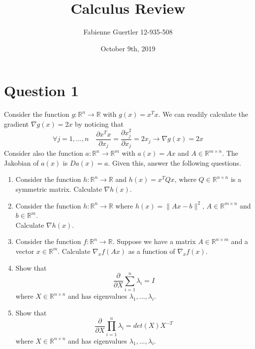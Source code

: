 \documentclass[
	10pt, %
]{../fphw}
\title{Calculus Review} %
\author{Fabienne Guertler 12-935-508} %
\date{October 9th, 2019} %
\institute{University of Bern} %
\begin{document}
	\maketitle
	\section*{Question 1 }
	\begin{problem}
		Consider the function $g:\mathbb{R}^n \rightarrow \mathbb{R}$ with $g(x) = x^Tx$. We can readily calculate the gradient $\nabla g(x) = 2x$ by noticing that
		\begin{equation*}
			\forall j=1,...,n
			\quad
			\frac{\partial x^Tx}{\partial x_j} = \frac{\partial x_j^2}{\partial x_j} = 2x_j \rightarrow \nabla g(x) = 2x
		\end{equation*} 
		Consider also the function $a:\mathbb{R}^n \rightarrow \mathbb{R}^m$ with $a(x) = Ax$ and $A \in \mathbb{R}^{m \times n}$. The Jakobian of $a(x)$ is $Da(x) = a$. Given this, answer the following questions.
		\medskip
		\begin{enumerate}
			\item Consider the function $h:\mathbb{R}^n \rightarrow \mathbb{R}$ and $h(x) = x^TQx\text{, where } Q\in\mathbb{R}^{n\times n}$ is a symmetric matrix. Calculate $\nabla h(x)$.
			\item Consider the function $h:\mathbb{R}^n \rightarrow \mathbb{R}$ where $h(x) = \|Ax-b\|^2 \text{, } A\in\mathbb{R}^{m\times n}$ and $b\in\mathbb{R}^m$.\\ Calculate $\nabla h(x)$.
			\item Consider the function $f:\mathbb{R}^n \rightarrow \mathbb{R}$. Suppose we have a matrix $A\in\mathbb{R}^{n\times m}$ and a vector $x\in\mathbb{R}^m$. Calculate $\nabla_x f(Ax)$ as a function of $\nabla_x f(x)$. 
			\item Show that
			\begin{equation*}
			\frac{\partial}{\partial X}\sum_{i=1}^{n}\lambda_i = I
			\end{equation*}
			where $X\in\mathbb{R}^{n\times n}$ and has eigenvalues $\lambda_1,...,\lambda_i$.
			\item Show that
			\begin{equation*}
				\frac{\partial}{\partial X}\prod_{i=1}^{n}\lambda_i = det(X)X^{-T}
			\end{equation*}
			where $X\in\mathbb{R}^{n\times n}$ and has eigenvalues $\lambda_1,...,\lambda_i$.
		\end{enumerate}
	\end{problem}
\end{document}
